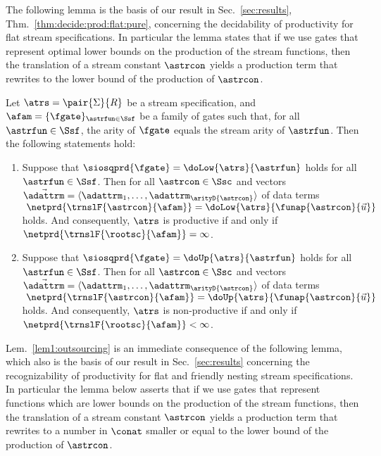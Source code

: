 The following lemma is the basis of our result in Sec.~\ref{sec:results},
Thm.~\ref{thm:decide:prod:flat:pure}, concerning the decidability of 
\daob{} productivity for flat stream specifications.
In particular the lemma states that if we use gates that represent \daobly{} optimal lower bounds
on the production of the stream functions,
then the translation of a stream constant $\astrcon$
yields a production term that rewrites to the \daob{} lower bound of the production of $\astrcon$.




\begin{lemma}
  \label{lem1:outsourcing}
Let $\atrs = \pair{\Sigma}{R}$ be a stream specification, and
  $\afam = \{\fgate\}_{\astrfun\in\Ssf}$ be a family of gates
  such that, for all\/ $\astrfun\in\Ssf$, the arity of\/ $\fgate$
  equals the stream arity of\/ $\astrfun$.
  Then the following statements hold:
\begin{enumerate}
    \renewcommand{\labelenumi}{(\roman{enumi})}
\item\label{lem1:outsourcing:item:1}
      Suppose that\/ $\siosqprd{\fgate} = \doLow{\atrs}{\astrfun}$
      holds for all\/ $\astrfun \in \Ssf$.
Then for all\/ $\astrcon\in\Ssc$ 
      and vectors $\vec{\adattrm} = \langle \adattrm_1, \ldots, \adattrm_{\arityD{\astrcon}} \rangle$ 
      of data terms
$\; \netprd{\trnslF{\astrcon}{\afam}}
                = \doLow{\atrs}{\funap{\astrcon}{\vec{u}}} $
      holds.                   
And consequently, $\atrs$ is \daobly{} productive
      if and only if\/ $\netprd{\trnslF{\rootsc}{\afam}} = \infty$.
\vspace*{0.75ex}
\item\label{lem1:outsourcing:item:2}
      Suppose that\/ $\siosqprd{\fgate} = \doUp{\atrs}{\astrfun}$
      holds for all\/ $\astrfun \in \Ssf$.
Then for all\/ $\astrcon\in\Ssc$ 
      and vectors $\vec{\adattrm} = \langle \adattrm_1, \ldots, \adattrm_{\arityD{\astrcon}} \rangle$ 
      of data terms 
$\; \netprd{\trnslF{\astrcon}{\afam}}
                = \doUp{\atrs}{\funap{\astrcon}{\vec{u}}} $
      holds.          
And consequently, $\atrs$ is \daobly{} non-productive
      if and only if\/ $\netprd{\trnslF{\rootsc}{\afam}} < \infty$.
\end{enumerate}
\end{lemma}
Lem.~\ref{lem1:outsourcing} is an immediate consequence of the following lemma,
which also is the basis of our result in Sec.~\ref{sec:results} 
concerning the recognizability of productivity for flat and friendly nesting
stream specifications. 
In particular the lemma below asserts that if we use gates that
represent \pein{} functions which are lower bounds 
on the production of the stream functions,
then the translation of a stream constant $\astrcon$
yields a production term that rewrites to a number in $\conat$
smaller or equal to the \daob{} lower bound of the production of $\astrcon$.



